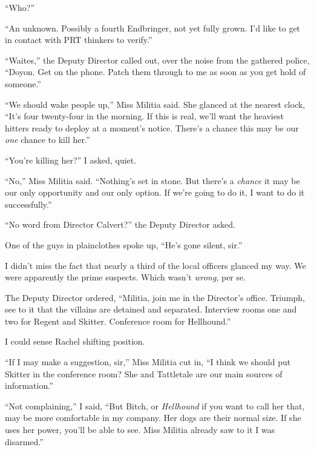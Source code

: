 ``Who?''



``An unknown.  Possibly a fourth Endbringer, not yet fully grown.  I'd like to get in contact with PRT thinkers to verify.''



``Waites,'' the Deputy Director called out, over the noise from the gathered police,  ``Doyon.  Get on the phone.  Patch them through to me as soon as you get hold of someone.''



``We should wake people up,'' Miss Militia said.  She glanced at the nearest clock, ``It's four twenty-four in the morning.  If this is real, we'll want the heaviest hitters ready to deploy at a moment's notice.  There's a chance this may be our \emph{one} chance to kill her.''



``You're killing her?'' I asked, quiet.



``No,'' Miss Militia said.  ``Nothing's set in stone.  But there's a \emph{chance} it may be our only opportunity and our only option.  If we're going to do it, I want to do it successfully.''



``No word from Director Calvert?'' the Deputy Director asked.



One of the guys in plainclothes spoke up, ``He's gone silent, sir.''



I didn't miss the fact that nearly a third of the local officers glanced my way.  We were apparently the prime suspects.  Which wasn't \emph{wrong}, per se.



The Deputy Director ordered, ``Militia, join me in the Director's office.  Triumph, see to it that the villains are detained and separated.  Interview rooms one and two for Regent and Skitter.  Conference room for Hellhound.''



I could sense Rachel shifting position.



``If I may make a suggestion, sir,'' Miss Militia cut in, ``I think we should put Skitter in the conference room?  She and Tattletale are our main sources of information.''



``Not complaining,'' I said, ``But Bitch, or \emph{Hellhound} if you want to call her that, may be more comfortable in my company.  Her dogs are their normal size.  If she uses her power, you'll be able to see.  Miss Militia already saw to it I was disarmed.''



